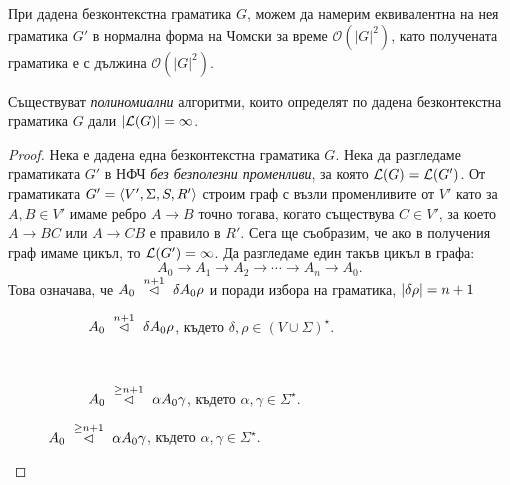 \begin{theorem}
  При дадена безконтекстна граматика $G$, можем да намерим еквивалентна
  на нея граматика $G'$ в нормална форма на Чомски за време $\mathcal{O}(|G|^2)$,
  като получената граматика е с дължина $\mathcal{O}(|G|^2)$.
\end{theorem}

\begin{theorem}
  Съществуват \emph{полиномиални} алгоритми, които определят по дадена безконтекстна граматика $G$ дали $\vert{\mathcal{L}(G)}\vert = \infty$.
\end{theorem}
\begin{proof}
  Нека е дадена една безконтекстна граматика $G$.
  Нека да разгледаме граматиката $G'$ в НФЧ {\em без безполезни променливи}, за която $\mathcal{L}(G) = \mathcal{L}(G')$.
  От граматиката $G' = \langle{V',\Sigma,S,R'}\rangle$ строим граф с възли променливите от $V'$ като
  за $A,B \in V'$ имаме ребро $A \to B$ точно тогава, когато съществува $C \in V'$,
  за което $A \to BC$ или $A \to CB$ е правило в $R'$.
  Сега ще съобразим, че ако в получения граф имаме цикъл, то $\mathcal{L}(G') = \infty$.
  Да разгледаме един такъв цикъл в графа:
  \[A_0 \to A_1 \to A_2 \to \cdots \to A_n \to A_0.\]
  Това означава, че $A_0 ~\stackrel{{n+1}}{\lhd}~ \delta A_0 \rho$ и поради избора на граматика, $\vert{\delta\rho}\vert = n+1$

  \begin{figure}[H]
    \begin{subfigure}[t]{0.5\textwidth}
    \centering
    \caption{$A_0 ~\stackrel{{n+1}}{\lhd}~ \delta A_0 \rho$, където $\delta, \rho \in (V\cup\Sigma)^\star$.}
    \end{subfigure}
    ~ 
    \begin{subfigure}[t]{0.5\textwidth}
      \centering
      \caption{$A_0 ~\stackrel{{\geq n+1}}{\lhd}~\alpha A_0\gamma$, където $\alpha,\gamma \in \Sigma^\star$.}
    \end{subfigure}
  \end{figure}


\end{proof}

